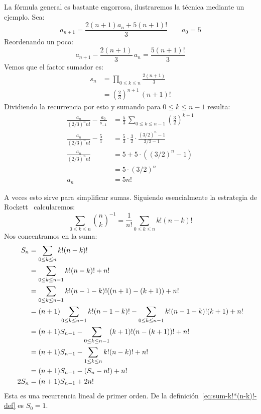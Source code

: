   La fórmula general es bastante engorrosa,
  ilustraremos la técnica mediante un ejemplo.
  Sea:
  \begin{equation}
    \label{eq:recurrencia-ejemplo-1}
    a_{n + 1}
      = \frac{2 (n + 1) a_n + 5 (n + 1)!}{3}
      \qquad a_0 = 5
  \end{equation}
  Reordenando un poco:
  \begin{equation*}
    a_{n + 1} - \frac{2 (n + 1)}{3} \, a_n
      = \frac{5 (n + 1)!}{3}
  \end{equation*}
  Vemos que el factor sumador es:
  \begin{align*}
    s_n
      &= \prod_{0 \le k \le n} \frac{2 (n + 1)}{3} \\
      &= \left( \frac{2}{3} \right)^{n + 1} \, (n + 1)!
  \end{align*}
  Dividiendo la recurrencia por esto y sumando para \(0 \le k \le n - 1\)
  resulta:
  \begin{align*}
    \frac{a_n}{(2/3)^n n!} - \frac{a_0}{s_{-1}}
      &= \frac{5}{3} \, \sum_{0 \le k \le n - 1}
			  \left( \frac{3}{2} \right)^{k + 1} \\
    \frac{a_n}{(2/3)^n n!} - \frac{5}{1}
      &= \frac{5}{3} \cdot \frac{3}{2} \cdot \frac{(3/2)^n - 1}{3/2 - 1} \\
    \frac{a_n}{(2/3)^n n!}
      &= 5 + 5 \cdot \left( (3/2)^n - 1 \right) \\
      &= 5 \cdot (3/2)^n \\
    a_n
      &= 5 n!
  \end{align*}

  A veces esto sirve para simplificar sumas.
  Siguiendo esencialmente la estrategia de Rockett~%
    \cite{rockett81:_sums_inver_binom_coeff}
  calcularemos:
  \begin{equation*}
    \sum_{0 \le k \le n} \binom{n}{k}^{-1}
      = \frac{1}{n!} \sum_{0 \le k \le n} k! (n - k)!
  \end{equation*}
  Nos concentramos en la suma:
  \begin{align}
    S_n
      &= \sum_{0 \le k \le n} k! (n - k)!
	    \label{eq:sum-k!*(n-k)!-def} \\
      &= \sum_{0 \le k \le n - 1} k! (n - k)! + n! \notag \\
      &= \sum_{0 \le k \le n - 1} k! (n - 1 - k)! ((n + 1) - (k + 1))
	   + n! \notag \\
      &= (n + 1) \sum_{0 \le k \le n - 1} k! (n - 1 - k)!
	   - \sum_{0 \le k \le n - 1} k! (n - 1 - k)! (k + 1)
	   + n! \notag \\
      &= (n + 1) S_{n - 1}
	   - \sum_{0 \le k \le n - 1} (k + 1)! (n - (k + 1))!
	   + n! \notag \\
      &= (n + 1) S_{n - 1}
	   - \sum_{1 \le k \le n} k! (n - k)!
	   + n! \notag \\
      &= (n + 1) S_{n - 1}
	   - (S_n - n!)
	   + n! \notag \\
   2 S_n
      &= (n + 1) S_{n - 1} + 2 n!
	    \label{eq:sum-k!*(n-k)!-rec}
  \end{align}
  Esta es una recurrencia lineal de primer orden.%
  De la definición~\eqref{eq:sum-k!*(n-k)!-def} es \(S_0 = 1\).

